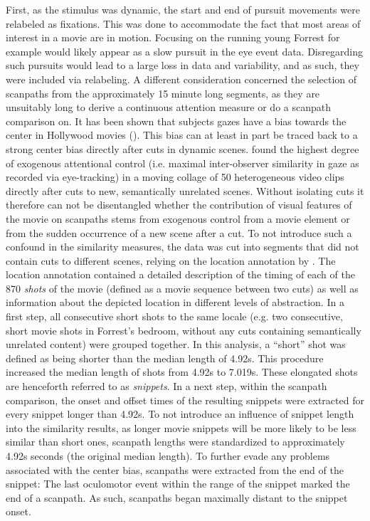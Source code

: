 \documentclass[a4paper, 12pt]{scrreprt}
\begin{document}
First, as the stimulus was dynamic, the start and end of pursuit movements were relabeled as fixations. This was done to accommodate the fact that most areas of interest in a movie are in motion. Focusing on the running young Forrest for example would likely appear as a slow pursuit in the eye event data. Disregarding such pursuits would lead to a large loss in data and variability, and as such, they were included via relabeling. \newline A different consideration concerned the selection of scanpaths from the approximately 15 minute long segments, as they are unsuitably long to derive a continuous attention measure or do a scanpath comparison on. It has been shown that subjects gazes have a bias towards the center in Hollywood movies (\cite{tseng2009quantifying}). This bias can at least in part be traced back to a strong center bias directly after cuts in dynamic scenes. \textcite{carmi2006visual} found the highest degree of exogenous attentional control (i.e. maximal inter-observer similarity in gaze as recorded via eye-tracking) in a moving collage of 50 heterogeneous video clips directly after cuts to new, semantically unrelated scenes. Without isolating cuts it therefore can not be disentangled whether the contribution of visual features of the movie on scanpaths stems from exogenous control from a movie element or from the sudden occurrence of a new scene after a cut. To not introduce such a confound in the similarity measures, the data was cut into segments that did not contain cuts to different scenes, relying on the location annotation by \textcite{hausler2016annotation}. The location annotation contained a detailed description of the timing of each of the 870 \textit{shots }of the movie (defined as a movie sequence between two cuts) as well as information about the depicted location in different levels of abstraction. In a first step, all consecutive short shots to the same locale (e.g. two consecutive, short movie shots in Forrest's bedroom, without any cuts containing semantically unrelated content) were grouped together. In this analysis, a “short” shot was defined as being shorter than the median length of 4.92s. This procedure increased the median length of shots from 4.92s to 7.019s. These elongated shots are henceforth referred to as \textit{snippets}. In a next step, within the scanpath comparison, the onset and offset times of the resulting snippets were extracted for every snippet longer than 4.92s. To not introduce an influence of snippet length into the similarity results, as longer movie snippets will be more likely to be less similar than short ones, scanpath lengths were standardized to approximately 4.92s seconds (the original median length). To further evade any problems associated with the center bias, scanpaths were extracted from the end of the snippet: The last oculomotor event within the range of the snippet marked the end of a scanpath. As such, scanpaths began maximally distant to the snippet onset.
\end{document}
